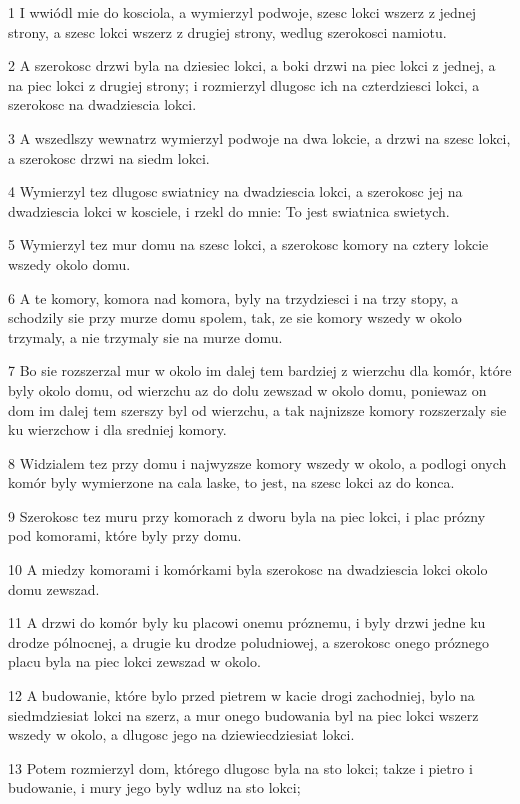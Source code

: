 \par 1 I wwiódl mie do kosciola, a wymierzyl podwoje, szesc lokci wszerz z jednej strony, a szesc lokci wszerz z drugiej strony, wedlug szerokosci namiotu.
\par 2 A szerokosc drzwi byla na dziesiec lokci, a boki drzwi na piec lokci z jednej, a na piec lokci z drugiej strony; i rozmierzyl dlugosc ich na czterdziesci lokci, a szerokosc na dwadziescia lokci.
\par 3 A wszedlszy wewnatrz wymierzyl podwoje na dwa lokcie, a drzwi na szesc lokci, a szerokosc drzwi na siedm lokci.
\par 4 Wymierzyl tez dlugosc swiatnicy na dwadziescia lokci, a szerokosc jej na dwadziescia lokci w kosciele, i rzekl do mnie: To jest swiatnica swietych.
\par 5 Wymierzyl tez mur domu na szesc lokci, a szerokosc komory na cztery lokcie wszedy okolo domu.
\par 6 A te komory, komora nad komora, byly na trzydziesci i na trzy stopy, a schodzily sie przy murze domu spolem, tak, ze sie komory wszedy w okolo trzymaly, a nie trzymaly sie na murze domu.
\par 7 Bo sie rozszerzal mur w okolo im dalej tem bardziej z wierzchu dla komór, które byly okolo domu, od wierzchu az do dolu zewszad w okolo domu, poniewaz on dom im dalej tem szerszy byl od wierzchu, a tak najnizsze komory rozszerzaly sie ku wierzchow i dla sredniej komory.
\par 8 Widzialem tez przy domu i najwyzsze komory wszedy w okolo, a podlogi onych komór byly wymierzone na cala laske, to jest, na szesc lokci az do konca.
\par 9 Szerokosc tez muru przy komorach z dworu byla na piec lokci, i plac prózny pod komorami, które byly przy domu.
\par 10 A miedzy komorami i komórkami byla szerokosc na dwadziescia lokci okolo domu zewszad.
\par 11 A drzwi do komór byly ku placowi onemu próznemu, i byly drzwi jedne ku drodze pólnocnej, a drugie ku drodze poludniowej, a szerokosc onego próznego placu byla na piec lokci zewszad w okolo.
\par 12 A budowanie, które bylo przed pietrem w kacie drogi zachodniej, bylo na siedmdziesiat lokci na szerz, a mur onego budowania byl na piec lokci wszerz wszedy w okolo, a dlugosc jego na dziewiecdziesiat lokci.
\par 13 Potem rozmierzyl dom, którego dlugosc byla na sto lokci; takze i pietro i budowanie, i mury jego byly wdluz na sto lokci;
